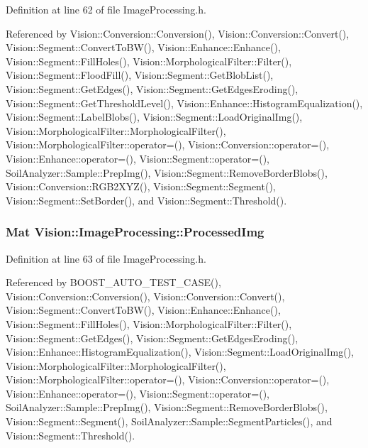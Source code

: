 Definition at line 62 of file Image\+Processing.\+h.



Referenced by Vision\+::\+Conversion\+::\+Conversion(), Vision\+::\+Conversion\+::\+Convert(), Vision\+::\+Segment\+::\+Convert\+To\+B\+W(), Vision\+::\+Enhance\+::\+Enhance(), Vision\+::\+Segment\+::\+Fill\+Holes(), Vision\+::\+Morphological\+Filter\+::\+Filter(), Vision\+::\+Segment\+::\+Flood\+Fill(), Vision\+::\+Segment\+::\+Get\+Blob\+List(), Vision\+::\+Segment\+::\+Get\+Edges(), Vision\+::\+Segment\+::\+Get\+Edges\+Eroding(), Vision\+::\+Segment\+::\+Get\+Threshold\+Level(), Vision\+::\+Enhance\+::\+Histogram\+Equalization(), Vision\+::\+Segment\+::\+Label\+Blobs(), Vision\+::\+Segment\+::\+Load\+Original\+Img(), Vision\+::\+Morphological\+Filter\+::\+Morphological\+Filter(), Vision\+::\+Morphological\+Filter\+::operator=(), Vision\+::\+Conversion\+::operator=(), Vision\+::\+Enhance\+::operator=(), Vision\+::\+Segment\+::operator=(), Soil\+Analyzer\+::\+Sample\+::\+Prep\+Img(), Vision\+::\+Segment\+::\+Remove\+Border\+Blobs(), Vision\+::\+Conversion\+::\+R\+G\+B2\+X\+Y\+Z(), Vision\+::\+Segment\+::\+Segment(), Vision\+::\+Segment\+::\+Set\+Border(), and Vision\+::\+Segment\+::\+Threshold().

\hypertarget{class_vision_1_1_image_processing_aa7d65742882cd1b2a1e4e9cb68809211}{}
\subsubsection[{Processed\+Img}]{\setlength{\rightskip}{0pt plus 5cm}Mat Vision\+::\+Image\+Processing\+::\+Processed\+Img}\label{class_vision_1_1_image_processing_aa7d65742882cd1b2a1e4e9cb68809211}


Definition at line 63 of file Image\+Processing.\+h.



Referenced by B\+O\+O\+S\+T\+\_\+\+A\+U\+T\+O\+\_\+\+T\+E\+S\+T\+\_\+\+C\+A\+S\+E(), Vision\+::\+Conversion\+::\+Conversion(), Vision\+::\+Conversion\+::\+Convert(), Vision\+::\+Segment\+::\+Convert\+To\+B\+W(), Vision\+::\+Enhance\+::\+Enhance(), Vision\+::\+Segment\+::\+Fill\+Holes(), Vision\+::\+Morphological\+Filter\+::\+Filter(), Vision\+::\+Segment\+::\+Get\+Edges(), Vision\+::\+Segment\+::\+Get\+Edges\+Eroding(), Vision\+::\+Enhance\+::\+Histogram\+Equalization(), Vision\+::\+Segment\+::\+Load\+Original\+Img(), Vision\+::\+Morphological\+Filter\+::\+Morphological\+Filter(), Vision\+::\+Morphological\+Filter\+::operator=(), Vision\+::\+Conversion\+::operator=(), Vision\+::\+Enhance\+::operator=(), Vision\+::\+Segment\+::operator=(), Soil\+Analyzer\+::\+Sample\+::\+Prep\+Img(), Vision\+::\+Segment\+::\+Remove\+Border\+Blobs(), Vision\+::\+Segment\+::\+Segment(), Soil\+Analyzer\+::\+Sample\+::\+Segment\+Particles(), and Vision\+::\+Segment\+::\+Threshold().

